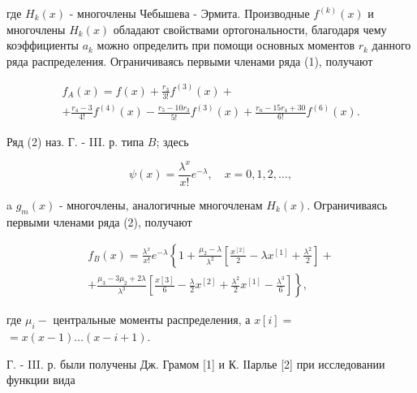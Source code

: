 \documentclass[10pt]{article}
\begin{document}
где $H_{k}(x)$ - многочлены Чебышева - Эрмита. Производные $f^{(k)}(x)$ и многочлены $H_{k}(x)$ обладают свойствами ортогональности, благодаря чему коэффициенты $a_{k}$ можно определить при помощи основных моментов $r_{k}$ данного ряда распределения. Ограничиваясь первыми членами ряда (1), получают



\[

\begin{gathered}

f_{A}(x)=f(x)+\frac{r_{3}}{3 !} f^{(3)}(x)+ \\

+\frac{r_{4}-3}{4 !} f^{(4)}(x)-\frac{r_{5}-10 r_{3}}{5 !} f^{(3)}(x)+\frac{r_{n}-15 r_{4}+30}{6 !} f^{(6)}(x) .

\end{gathered}

\]



Ряд (2) наз. Г. - III. р. типа $B$; здесь



\[

\psi(x)=\frac{\lambda^{x}}{x !} e^{-\lambda}, \quad x=0,1,2, \ldots,

\]



a $g_{m}(x)$ - многочлены, аналогичные многочленам $H_{k}(x)$. Ограничиваясь первыми членами ряда (2), получают



\[

\begin{gathered}

f_{B}(x)=\frac{\lambda^{x}}{x !} e^{-\lambda}\left\{1+\frac{\mu_{2}-\lambda}{\lambda^{2}}\left[\frac{x^{[2]}}{2}-\lambda x^{[1]}+\frac{\lambda^{2}}{2}\right]+\right. \\

\left.+\frac{\mu_{3}-3 \mu_{2}+2 \lambda}{\lambda^{3}}\left[\frac{x[3]}{6}-\frac{\lambda}{2} x^{[2]}+\frac{\lambda^{2}}{2} x^{[1]}-\frac{\lambda^{3}}{6}\right]\right\},

\end{gathered}

\]



где $\mu_{i}-$ центральные моменты распределения, а $x[i]=$ $=x(x-1) \ldots(x-i+1)$.



Г. - III. р. были получены Дж. Грамом [1] и К. ІІарлье [2] при исследовании функции вида
\end{document}
